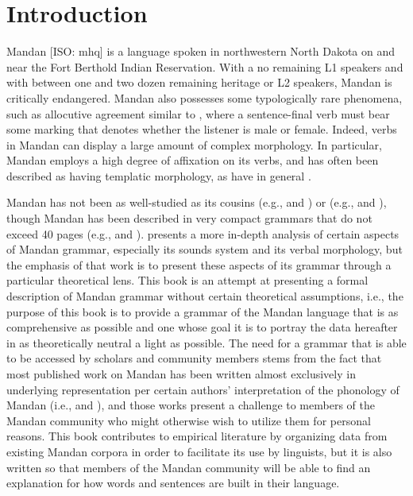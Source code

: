 \chapter{Introduction}\label{chapter1}
\largerpage
Mandan [ISO: mhq] is a  language spoken in northwestern North Dakota on and near the Fort Berthold Indian Reservation. With a no remaining L1 speakers and with between one and two dozen remaining heritage or L2 speakers, Mandan is critically endangered. Mandan also possesses some typologically rare phenomena, such as {allocutive agreement} similar to , where a sentence-final verb must bear some marking that denotes whether the listener is male or female. Indeed, verbs in Mandan can display a large amount of complex morphology. In particular, Mandan employs a high degree of affixation on its verbs, and has often been described as having {templatic morphology}, as have  in general \citep{rankinetal2003}. 

Mandan has not been as well-studied as its cousins  (e.g., \citealt{roodtaylor1996} and \citealt{ullrichblackbear2016}) or  (e.g., \citealt{wallace1993} and \citealt{graczyk2007}), though Mandan has been described in very compact grammars that do not exceed 40 pages (e.g., \citealt{kennard1936} and \citealt{mixco1997a}). \citet{kasak2019} presents a more in-depth analysis of certain aspects of Mandan grammar, especially its sounds system and its verbal morphology, but the emphasis of that work is to present these aspects of its grammar through a particular theoretical lens. This book is an attempt at presenting a formal description of Mandan grammar without certain theoretical assumptions, i.e., the purpose of this book is to provide a grammar of the Mandan language that is as comprehensive as possible and one whose goal it is to portray the data hereafter in as theoretically neutral a light as possible. The need for a grammar that is able to be accessed by scholars and community members stems from the fact that most published work on Mandan has been written almost exclusively in underlying representation per certain authors' interpretation of the phonology of Mandan (i.e., \citealt{hollow1970} and \citealt{mixco1997a}), and those works present a challenge to members of the Mandan community who  might otherwise wish to utilize them for personal reasons. This book contributes to empirical literature by organizing data from existing Mandan corpora in order to facilitate its use by linguists, but it is also written so that members of the Mandan community will be able to find an explanation for how words and sentences are built in their language.


